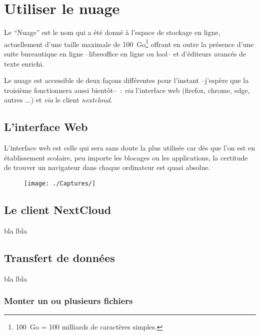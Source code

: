 \chapter*{Utiliser le nuage}

Le ``Nuage'' est le nom qui a été donné à l'espace de stockage en ligne, actuellement d'une taille maximale de 100~Go\footnote{%
100~Go = 100 milliards de caractères simples.
} 
offrant en outre la présence d'une suite bureautique en ligne --libreoffice en ligne ou lool-- et d'éditeurs avancés de texte enrichi.

Le nuage est accessible de deux façons différentes pour l'instant --j'espère que la troisième fonctionnera aussi bientôt--~: \emph{via} l'interface web (firefox, chrome, edge, autres ...) et \emph{via} le client \emph{nextcloud}.

\section*{L'interface Web}

L'interface web est celle qui sera sans doute la plus utilisée car dès que l'on est en établissement scolaire, peu importe les blocages ou les applications, la certitude de trouver un navigateur dans chaque ordinateur est quasi absolue.

\begin{figure}
	\centering
	\texttt{[image: ./Captures/]}
	\caption{}
\end{figure}


\section*{Le client NextCloud}

bla lbla

\section*{Transfert de données}

bla lbla

\subsection*{Monter un ou plusieurs fichiers}

